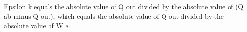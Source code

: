 Epsilon k equals the absolute value of Q out divided by the absolute value of (Q ab minus Q out), which equals the absolute value of Q out divided by the absolute value of W e.